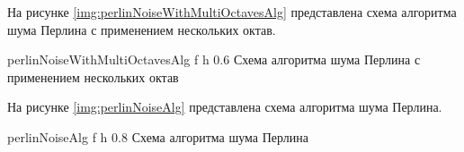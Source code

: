 \clearpage

На рисунке \ref{img:perlinNoiseWithMultiOctavesAlg} представлена схема алгоритма шума Перлина с применением нескольких октав.

{perlinNoiseWithMultiOctavesAlg} %
{f} %
{h} %
{0.6\textwidth} %
{Схема алгоритма шума Перлина с применением нескольких октав} %

\clearpage

На рисунке \ref{img:perlinNoiseAlg} представлена схема алгоритма шума Перлина.

{perlinNoiseAlg} %
{f} %
{h} %
{0.8\textwidth} %
{Схема алгоритма шума Перлина} %

